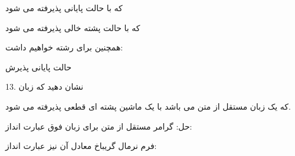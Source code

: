 \documentclass[]{article}
\begin{document}
که با حالت پایانی پذیرفته می شود

\begin{center}
\end{center}
که با حالت پشته خالی پذیرفته می شود

همچنین برای رشته  خواهیم داشت:

\begin{flushleft}
\end{flushleft}
حالت پایانی پذیرش



13. نشان دهید که زبان
\begin{center}
\end{center}

که یک زبان مستقل از متن می باشد با یک ماشین پشته ای قطعی پذیرفته می شود.

حل: گرامر مستقل از متن برای زبان فوق عبارت انداز:

\begin{center}
\end{center}
\begin{center}
\end{center}
\begin{center}
\end{center}

فرم نرمال گریباخ معادل آن نیز عبارت انداز:

\begin{center}
\end{center}
\begin{center}
\end{center}
\end{document}
